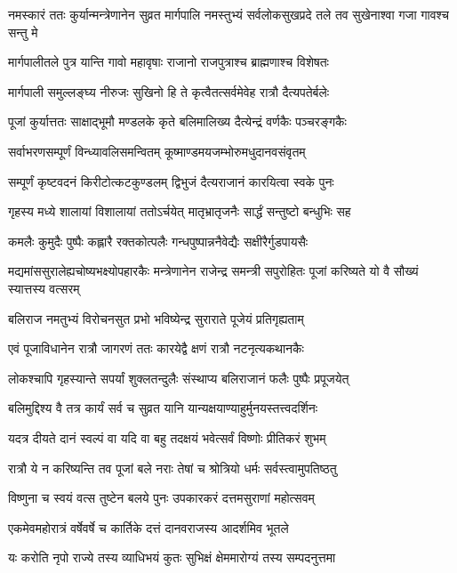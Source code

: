 \threelineshloka
{नमस्कारं ततः कुर्यान्मन्त्रेणानेन सुव्रत}
{मार्गपालि नमस्तुभ्यं सर्वलोकसुखप्रदे}
{तले तव सुखेनाश्वा गजा गावश्च सन्तु मे} %

\twolineshloka
{मार्गपालीतले पुत्र यान्ति गावो महावृषाः}
{राजानो राजपुत्राश्च ब्राह्मणाश्च विशेषतः} %

\twolineshloka
{मार्गपाली समुल्लङ्घ्य नीरुजः सुखिनो हि ते}
{कृत्वैतत्सर्वमेवेह रात्रौ दैत्यपतेर्बलेः} %

\twolineshloka
{पूजां कुर्यात्ततः साक्षाद्भूमौ मण्डलके कृते}
{बलिमालिख्य दैत्येन्द्रं वर्णकैः पञ्चरङ्गकैः} %

\twolineshloka
{सर्वाभरणसम्पूर्णं विन्ध्यावलिसमन्वितम्}
{कूष्माण्डमयजम्भोरुमधुदानवसंवृतम्} %

\twolineshloka
{सम्पूर्णं कृष्टवदनं किरीटोत्कटकुण्डलम्}
{द्विभुजं दैत्यराजानं कारयित्वा स्वके पुनः} %

\twolineshloka
{गृहस्य मध्ये शालायां विशालायां ततोऽर्चयेत्}
{मातृभ्रातृजनैः सार्द्धं सन्तुष्टो बन्धुभिः सह} %

\twolineshloka
{कमलैः कुमुदैः पुष्पैः कह्लारै रक्तकोत्पलैः}
{गन्धपुष्पान्ननैवेद्यैः सक्षीरैर्गुडपायसैः} %

\threelineshloka
{मद्यमांससुरालेह्यचोष्यभक्ष्योपहारकैः}
{मन्त्रेणानेन राजेन्द्र समन्त्री सपुरोहितः}
{पूजां करिष्यते यो वै सौख्यं स्यात्तस्य वत्सरम्} %

\twolineshloka
{बलिराज नमतुभ्यं विरोचनसुत प्रभो}
{भविष्येन्द्र सुराराते पूजेयं प्रतिगृह्यताम्} %

\twolineshloka
{एवं पूजाविधानेन रात्रौ जागरणं ततः}
{कारयेद्वै क्षणं रात्रौ नटनृत्यकथानकैः} %

\twolineshloka
{लोकश्चापि गृहस्यान्ते सपर्यां शुक्लतन्दुलैः}
{संस्थाप्य बलिराजानं फलैः पुष्पैः प्रपूजयेत्} %

\twolineshloka
{बलिमुद्दिश्य वै तत्र कार्यं सर्व च सुव्रत}
{यानि यान्यक्षयाण्याहुर्मुनयस्तत्त्वदर्शिनः} %

\twolineshloka
{यदत्र दीयते दानं स्वल्पं वा यदि वा बहु}
{तदक्षयं भवेत्सर्वं विष्णोः प्रीतिकरं शुभम्} %

\twolineshloka
{रात्रौ ये न करिष्यन्ति तव पूजां बले नराः}
{तेषां च श्रोत्रियो धर्मः सर्वस्त्वामुपतिष्ठतु} %

\twolineshloka
{विष्णुना च स्वयं वत्स तुष्टेन बलये पुनः}
{उपकारकरं दत्तमसुराणां महोत्सवम्} %

\twolineshloka
{एकमेवमहोरात्रं वर्षेवर्षे च कार्तिके}
{दत्तं दानवराजस्य आदर्शमिव भूतले} %

\twolineshloka
{यः करोति नृपो राज्ये तस्य व्याधिभयं कुतः}
{सुभिक्षं क्षेममारोग्यं तस्य सम्पदनुत्तमा} %



